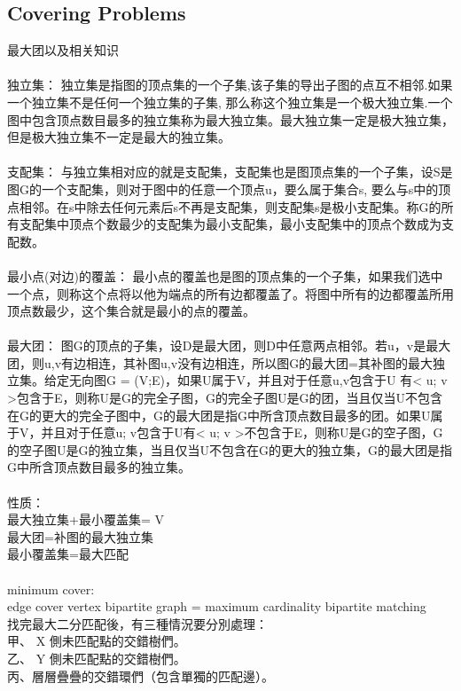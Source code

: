 \subsection{Covering Problems}
最大团以及相关知识\\
\\
独立集： 独立集是指图的顶点集的一个子集,该子集的导出子图的点互不相邻.如果一个独立集不是任何一个独立集的子集, 那么称这个独立集是一个极大独立集.一个图中包含顶点数目最多的独立集称为最大独立集。最大独立集一定是极大独立集，但是极大独立集不一定是最大的独立集。\\
\\
支配集： 与独立集相对应的就是支配集，支配集也是图顶点集的一个子集，设S是图G的一个支配集，则对于图中的任意一个顶点u，要么属于集合s, 要么与s中的顶点相邻。在s中除去任何元素后s不再是支配集，则支配集s是极小支配集。称G的所有支配集中顶点个数最少的支配集为最小支配集，最小支配集中的顶点个数成为支配数。\\
\\
最小点(对边)的覆盖： 最小点的覆盖也是图的顶点集的一个子集，如果我们选中一个点，则称这个点将以他为端点的所有边都覆盖了。将图中所有的边都覆盖所用顶点数最少，这个集合就是最小的点的覆盖。\\
\\
最大团： 图G的顶点的子集，设D是最大团，则D中任意两点相邻。若u，v是最大团，则u,v有边相连，其补图u,v没有边相连，所以图G的最大团=其补图的最大独立集。给定无向图G = (V;E)，如果U属于V，并且对于任意u,v包含于U 有< u; v >包含于E，则称U是G的完全子图，G的完全子图U是G的团，当且仅当U不包含在G的更大的完全子图中，G的最大团是指G中所含顶点数目最多的团。如果U属于V，并且对于任意u; v包含于U有< u; v >不包含于E，则称U是G的空子图，G的空子图U是G的独立集，当且仅当U不包含在G的更大的独立集，G的最大团是指G中所含顶点数目最多的独立集。\\
\\
性质： \\
最大独立集+最小覆盖集= V\\
最大团=补图的最大独立集\\
最小覆盖集=最大匹配\\
\\
minimum cover:\\
edge cover vertex bipartite graph = maximum cardinality bipartite matching\\
找完最大二分匹配後，有三種情況要分別處理：\\
甲、 X 側未匹配點的交錯樹們。\\
乙、 Y 側未匹配點的交錯樹們。\\
丙、層層疊疊的交錯環們（包含單獨的匹配邊）。\\
